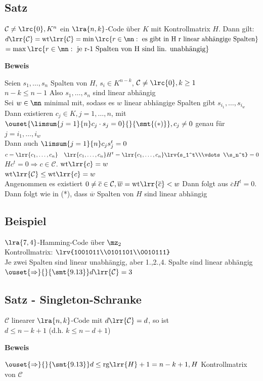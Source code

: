 	\subsection{Satz}
		$\mathcal{C}\neq\lrc{0}, K^n$ ein $\lra{n,k}$-Code über $K$ mit Kontrollmatrix $H$. Dann gilt:\\
		$d\lrr{\mathcal{C}}=\mbox{wt}\lrr{\mathcal{C}}=\min\lrc{r\in\mn:\mbox{ es gibt in H r linear abhängige Spalten}}$\\
		$=\max\lrc{r\in\mn:\mbox{ je r-1 Spalten von H sind lin. unabhängig}}$

		\textbf{Beweis}

		Seien $s_1,\dots,s_n$ Spalten von $H$, $s_i\in K^{n-k}$, $\mathcal{C}\neq\lrc{0}, k\geq 1$\\
		$n-k\leq n-1$ Also $s_1,\dots,s_n$ sind linear abhängig\\
		Sei $w\in\mn$ minimal mit, sodass es $w$ linear abhängige Spalten gibt $s_{i_1},\dots,s_{i_w}$\\
		Dann existieren $c_j\in K, j=1,\dots,n$, mit $\ouset{\limsum{j=1}{n}c_j\cdot s_j=0}{}{\smt{(*)}}, c_j\neq 0$ genau für $j=i_1,\dots,i_w$\\
		Dann auch $\limsum{j=1}{n}c_js_j^t=0$\\
		$c=\lrr{c_1,\dots,c_n}\quad \lrr{c_1,\dots,c_n}H^t=\lrr{c_1,\dots,c_n}\lrv{s_1^t\\\vdots\\s_n^t}=0$\\
		$Hc^t=0\Rightarrow c\in\mathcal{C}$. $\mbox{wt}\lrr{c}=w$\\
		$\mbox{wt}\lrr{\mathcal{C}}\leq\mbox{wt}\lrr{c}=w$\\
		Angenommen es existiert $0\neq\overline{c}\in\mathcal{C}, \overline{w}=\mbox{wt}\lrr{\overline{c}}<w$ Dann folgt aus $\overline{c}H^t=0$. Dann folgt wie in (*), dass $\overline{w}$ Spalten von $H$ sind linear abhängig \lightning

	\subsection{Beispiel}
		$\lra{7,4}$-Hamming-Code über $\mz_2$\\
		Kontrollmatrix: $\lrv{1001011\\0101101\\0010111}$\\
		Je zwei Spalten sind linear unabhängig, aber 1.,2.,4. Spalte sind linear abhängig\\
		$\ouset{\Rightarrow}{}{\smt{9.13}} d\lrr{\mathcal{C}}=3$

	\subsection{Satz - Singleton-Schranke}
		$\mathcal{C}$ linearer $\lra{n,k}$-Code mit $d\lrr{\mathcal{C}}=d$, so ist\\
		$d\leq n-k+1$ (d.h. $k\leq n-d+1$)

		\textbf{Beweis}

		$\ouset{\Rightarrow}{}{\smt{9.13}} d\leq\mbox{rg}\lrr{H}+1=n-k+1, H$ Kontrollmatrix von $\mathcal{C}$
